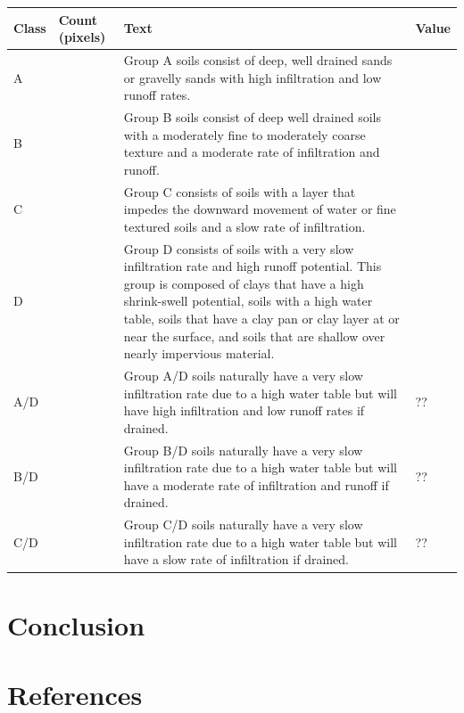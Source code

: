 \documentclass[
]{agujournal2019}
\begin{document}
\begin{longtable}[]{@{}
  >{\centering\arraybackslash}p{}
  >{\centering\arraybackslash}p{}
  >{\centering\arraybackslash}p{}
  >{\centering\arraybackslash}p{}@{}}
\toprule\noalign{}
\begin{minipage}[b]{\linewidth}\centering
Class
\end{minipage} & \begin{minipage}[b]{\linewidth}\centering
Count (pixels)
\end{minipage} & \begin{minipage}[b]{\linewidth}\centering
Text
\end{minipage} & \begin{minipage}[b]{\linewidth}\centering
Value
\end{minipage} \\
\midrule\noalign{}
\endhead
\bottomrule\noalign{}
\endlastfoot
A & 62559472 & Group A soils consist of deep, well drained sands or
gravelly sands with high infiltration and low runoff rates. & 10 \\
B & 76665198 & Group B soils consist of deep well drained soils with a
moderately fine to moderately coarse texture and a moderate rate of
infiltration and runoff. & 10 \\
C & 88491710 & Group C consists of soils with a layer that impedes the
downward movement of water or fine textured soils and a slow rate of
infiltration. & 8 \\
D & 155095790 & Group D consists of soils with a very slow infiltration
rate and high runoff potential. This group is composed of clays that
have a high shrink-swell potential, soils with a high water table, soils
that have a clay pan or clay layer at or near the surface, and soils
that are shallow over nearly impervious material. & 3 \\
A/D & 43192 & Group A/D soils naturally have a very slow infiltration
rate due to a high water table but will have high infiltration and low
runoff rates if drained. & ?? \\
B/D & 18456 & Group B/D soils naturally have a very slow infiltration
rate due to a high water table but will have a moderate rate of
infiltration and runoff if drained. & ?? \\
C/D & 217771 & Group C/D soils naturally have a very slow infiltration
rate due to a high water table but will have a slow rate of infiltration
if drained. & ?? \\
\end{longtable}

\section{Conclusion}\label{sec-conclusions}

\section*{References}\label{references}
\end{document}
